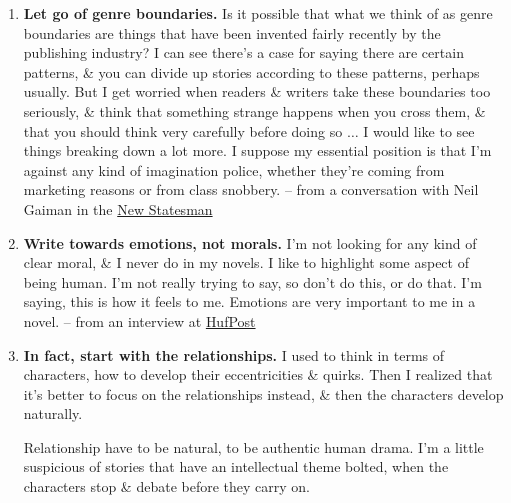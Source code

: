 \documentclass[oneside]{book}
\numberwithin{equation}{section}
\begin{document}
\begin{enumerate}
	\item \textbf{Let go of genre boundaries.} Is it possible that what we think of as genre boundaries are things that have been invented fairly recently by the publishing industry? I can see there's a case for saying there are certain patterns, \& you can divide up stories according to these patterns, perhaps usually. But I get worried when readers \& writers take these boundaries too seriously, \& think that something strange happens when you cross them, \& that you should think very carefully before doing so $\ldots$ I would like to see things breaking down a lot more. I suppose my essential position is that I'm against any kind of imagination police, whether they're coming from marketing reasons or from class snobbery. -- from a conversation with Neil Gaiman in the \href{https://www.newstatesman.com/2015/05/neil-gaiman-kazuo-ishiguro-interview-literature-genre-machines-can-toil-they-can-t-imagine}{New Statesman}
	\item \textbf{Write towards emotions, not morals.} I'm not looking for any kind of clear moral, \& I never do in my novels. I like to highlight some aspect of being human. I'm not really trying to say, so don't do this, or do that. I'm saying, this is how it feels to me. Emotions are very important to me in a novel. -- from an interview at \href{https://www.huffingtonpost.com/2015/03/03/kazuo-ishiguro-interview_n_6785824.html}{HufPost}
	\item \textbf{In fact, start with the relationships.} I used to think in terms of characters, how to develop their eccentricities \& quirks. Then I realized that it's better to focus on the relationships instead, \& then the characters develop naturally.
	
	Relationship have to be natural, to be authentic human drama. I'm a little suspicious of stories that have an intellectual theme bolted, when the characters stop \& debate before they carry on.
	

\end{enumerate}
\end{document}

